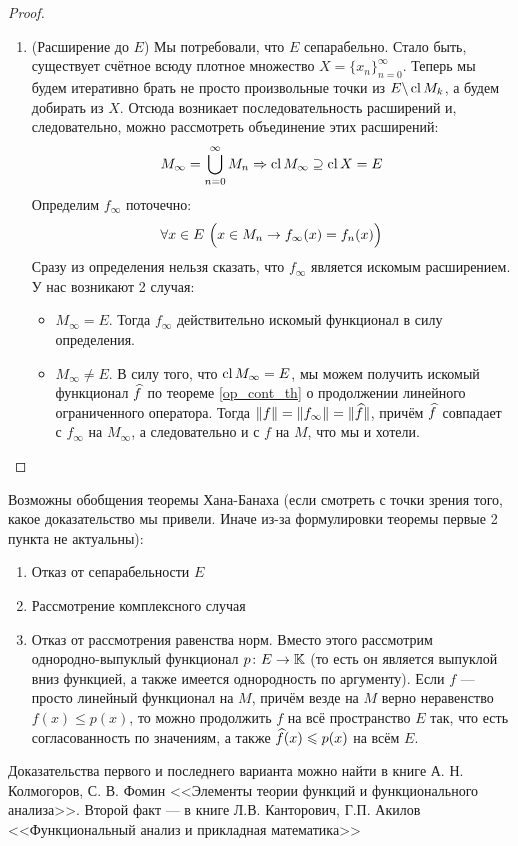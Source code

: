 \begin{proof}
\begin{enumerate}
		\item (Расширение до $E$) Мы потребовали, что $E$ сепарабельно. Стало быть, существует счётное всюду плотное множество $X = \{x_n\}_{n = 0}^\infty$. Теперь мы будем итеративно брать не просто произвольные точки из $E \backslash \operatorname{cl} M_k$, а будем добирать из $X$. Отсюда возникает последовательность расширений и, следовательно, можно рассмотреть объединение этих расширений:
		\[
			M_\infty = \bigcup_{n = 0}^\infty M_n \Rightarrow \operatorname{cl} M_\infty \supseteq \operatorname{cl} X = E
		\]
		Определим $f_\infty$ поточечно:
		\[
			\forall x \in E\ \Big(x \in M_n \rightarrow f_\infty(x) = f_n(x)\Big)
		\]
		Сразу из определения нельзя сказать, что $f_\infty$ является искомым расширением. У нас возникают 2 случая:
		\begin{itemize}
			\item $M_\infty = E$. Тогда $f_\infty$ действительно искомый функционал в силу определения.
			
			\item $M_\infty \neq E$. В силу того, что $\operatorname{cl} M_\infty = E$, мы можем получить искомый функционал $\widehat{f}$ по теореме \ref{op_cont_th} о продолжении линейного ограниченного оператора. Тогда $\|f\| = \|f_\infty\| = \|\widehat{f}\|$, причём $\widehat{f}$ совпадает с $f_\infty$ на $M_\infty$, а следовательно и с $f$ на $M$, что мы и хотели.
		\end{itemize}
	\end{enumerate}
\end{proof}

\begin{note}
	Возможны обобщения теоремы Хана-Банаха (если смотреть с точки зрения того, какое доказательство мы привели. Иначе из-за формулировки теоремы первые 2 пункта не актуальны):
	\begin{enumerate}
		\item Отказ от сепарабельности $E$
		
		\item Рассмотрение комплексного случая
		
		\item Отказ от рассмотрения равенства норм. Вместо этого рассмотрим \\ однородно-выпуклый функционал $p \colon E \to \mathbb{K}$ (то есть он является выпуклой вниз функцией, а также имеется однородность по аргументу). Если $f$ --- просто линейный функционал на $M$, причём везде на $M$ верно неравенство $f(x) \le p(x)$, то можно продолжить $f$ на всё пространство $E$ так, что есть согласованность по значениям, а также $\widehat{f}(x) \leqslant p(x)$ на всём $E$.
	\end{enumerate}
	Доказательства первого и последнего варианта можно найти в книге А. Н. Колмогоров, С. В. Фомин <<Элементы теории функций и функционального анализа>>. Второй факт --- в книге Л.В. Канторович, Г.П. Акилов <<Функциональный анализ и прикладная математика>>
\end{note}